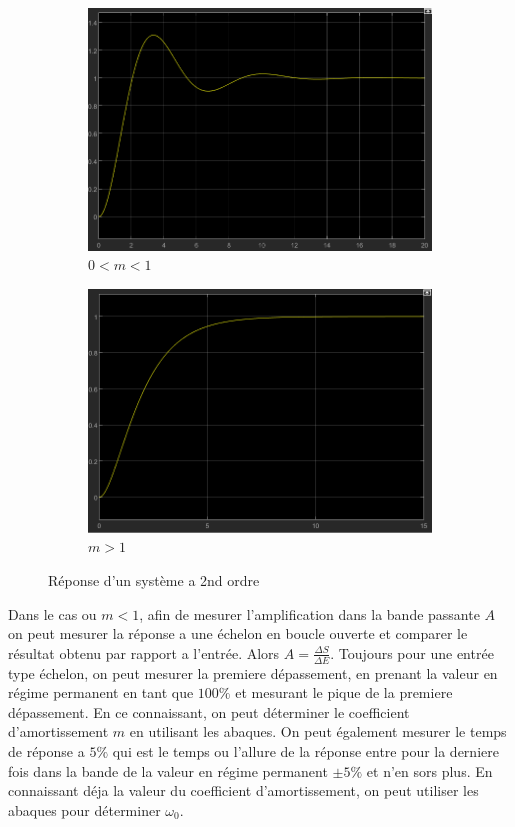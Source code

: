 \documentclass[12pt, a4paper]{report}
\begin{document}
\begin{figure}[h]
    \begin{subfigure}[h!]{0.4\linewidth}
    \includegraphics[width=\linewidth]{reponse2ndordresmallz.png}
    \caption{$0 < m < 1$}
    \end{subfigure}
    \hfill
    \begin{subfigure}[h!]{0.4\linewidth}
    \includegraphics[width=\linewidth]{reponse2ndordrebigz.png}
    \caption{$m > 1$}
    \end{subfigure}
    \caption{Réponse d'un système a 2nd ordre}
\end{figure}

Dans le cas ou $m < 1$, afin de mesurer l'amplification dans la bande passante $A$ on peut mesurer
la réponse a une échelon en boucle ouverte et comparer le résultat obtenu par rapport a l'entrée. Alors $A = \frac{\Delta S}{\Delta E}$.
Toujours pour une entrée type échelon, on peut mesurer la premiere dépassement, en prenant la valeur en régime permanent en tant que $100\%$ 
et mesurant le pique de la premiere dépassement. En ce connaissant, on peut déterminer le coefficient d'amortissement $m$ en utilisant les abaques.
On peut également mesurer le temps de réponse a $5\%$ qui est le temps ou l'allure de la réponse entre pour la derniere fois dans la bande
de la valeur en régime permanent $\pm 5\%$ et n'en sors plus. En connaissant déja la valeur du coefficient d'amortissement, on peut utiliser les abaques pour 
déterminer $\omega_0$.
\end{document}
